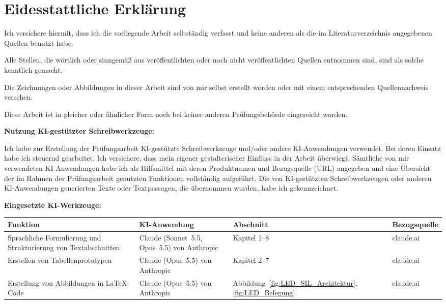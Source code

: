 
\chapter*{Eidesstattliche Erklärung}
\thispagestyle{empty}
Ich versichere hiermit, dass ich die vorliegende Arbeit selbständig verfasst und keine anderen als die im Literaturverzeichnis angegebenen Quellen benutzt habe.
\smallskip

\noindent
Alle Stellen, die wörtlich oder sinngemäß aus veröffentlichten oder noch nicht veröffentlichten Quellen entnommen sind, sind als solche kenntlich gemacht.
\smallskip

\noindent
Die Zeichnungen oder Abbildungen in dieser Arbeit sind von mir selbst erstellt worden oder mit einem entsprechenden Quellennachweis versehen.
\smallskip

\noindent
Diese Arbeit ist in gleicher oder ähnlicher Form noch bei keiner anderen Prüfungsbehörde eingereicht worden.
\medskip


\textbf{Nutzung KI-gestützter Schreibwerkzeuge:}

Ich habe zur Erstellung der Prüfungsarbeit KI-gestützte Schreibwerkzeuge und/oder
andere KI-Anwendungen verwendet. Bei deren Einsatz habe ich steuernd gearbeitet.
Ich versichere, dass mein eigener gestalterischer Einfluss in der Arbeit überwiegt.
Sämtliche von mir verwendeten KI-Anwendungen habe ich als Hilfsmittel mit deren
Produktnamen und Bezugsquelle (URL) angegeben und eine Übersicht der im Rahmen
der Prüfungsarbeit genutzten Funktionen vollständig aufgeführt. Die von
KI-gestützten Schreibwerkzeugen oder anderen KI-Anwendungen generierten Texte
oder Textpassagen, die übernommen wurden, habe ich gekennzeichnet.

\medskip

\textbf{Eingesetzte KI-Werkzeuge:}

\begin{table}[H]
  \centering
  \begin{tabular}{p{4.5cm} p{3.5cm} p{3cm} p{4cm}}
    \toprule
    \textbf{Funktion} & \textbf{KI-Anwendung} & \textbf{Abschnitt} & \textbf{Bezugsquelle} \\
    \midrule
    Sprachliche Formulierung und Strukturierung von Textabschnitten &
    Claude (Sonnet~5.5, Opus~5.5) von Anthropic &
    Kapitel 1--8 &
    claude.ai \\
    Erstellen von Tabellenprototypen & Claude (Opus~5.5) von Anthropic & Kapitel 2--7 & claude.ai \\
    Erstellung von Abbildungen in \LaTeX-Code & Claude (Opus~5.5) von Anthropic &
    Abbildung~\ref{fig:LED_SIL_Architektur}, \ref{fig:LED_Belegung} & claude.ai \\
    \bottomrule
  \end{tabular}
\end{table}


